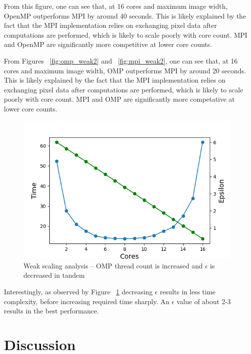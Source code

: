 
From this figure, one can see that, at 16 cores and maximum image width, OpenMP outperforms MPI by around 40 seconds. This is likely explained by the fact that the MPI implementation relies on exchanging pixel data after computations are performed, which is likely to scale poorly with core count. MPI and OpenMP are significantly more competitive at lower core counts.


From Figures ~\ref{fig:omp_weak2} and ~\ref{fig:mpi_weak2}, one can see that, at 16 cores and maximum image width, OMP outperforms MPI by around 20 seconds. This is likely explained by the fact that the MPI implementation relies on exchanging pixel data after computations are performed, which is likely to scale poorly with core count. MPI and OMP are significantly more competative at lower core counts.


\begin{figure}[h]
  \centering
  \includegraphics[width=0.55\linewidth]{figs/omp_weak.out}
	\caption{Weak scaling analysis -- OMP thread count is increased and $\epsilon$ is decreased in tandem}
    \label{fig:omp_weak}
\end{figure}

Interestingly, as observed by Figure ~\ref{fig:omp_weak} decreasing $\epsilon$ results in less time complexity, before increasing required time sharply. An $\epsilon$ value of about 2-3 results in the best performance.



\section{Discussion}
\label{sec:disc}

